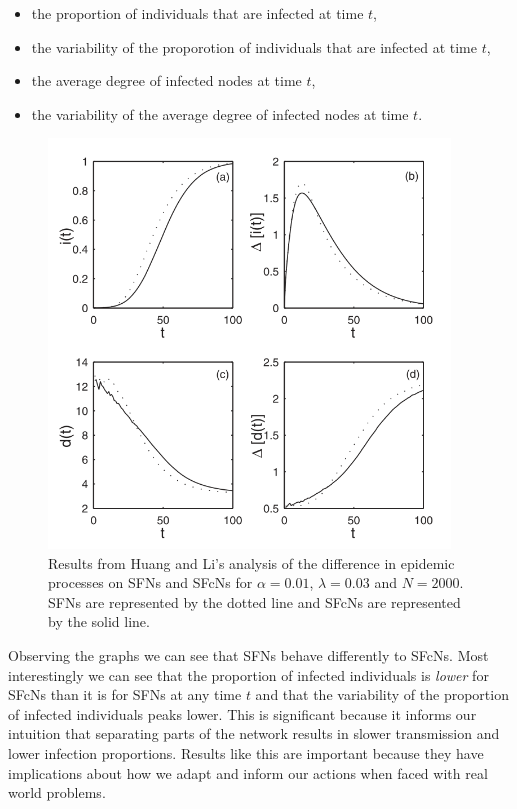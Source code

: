 \begin{itemize}
    \item the proportion of individuals that are infected at time $t$,
    \item the variability of the proporotion of individuals that are infected at time $t$,
    \item the average degree of infected nodes at time $t$,
    \item the variability of the average degree of infected nodes at time $t$.
\end{itemize}


\begin{figure}
    \begin{center}
        \includegraphics[width=0.95\textwidth]{img/si}
    \end{center}
    \caption{Results from Huang and Li's analysis of the difference in epidemic processes on SFNs and SFcNs for $\alpha = 0.01$, $\lambda = 0.03$ and $N = 2000$. SFNs are represented by the dotted line and SFcNs are represented by the solid line.}
    \label{fig:si}
\end{figure}

Observing the graphs we can see that SFNs behave differently to SFcNs. Most interestingly we can see that the proportion of infected individuals is \emph{lower} for SFcNs than it is for SFNs at any time $t$ and that the variability of the proportion of infected individuals peaks lower. This is significant because it informs our intuition that separating parts of the network results in slower transmission and lower infection proportions. Results like this are important because they have implications about how we adapt and inform our actions when faced with real world problems.
